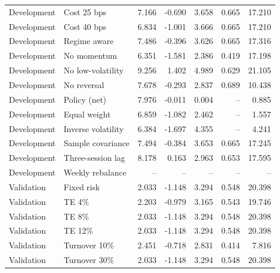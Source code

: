 \documentclass[11pt,a4paper]{article}
\begin{document}
\begin{center}
\begin{longtable}{@{}llrrrrr@{}}
Development & Cost 25 bps & 7.166 & -0.690 & 3.658 & 0.665 & 17.210\\

Development & Cost 40 bps & 6.834 & -1.001 & 3.666 & 0.665 & 17.210\\

Development & Regime aware & 7.486 & -0.396 & 3.626 & 0.665 & 17.316\\

Development & No momentum & 6.351 & -1.581 & 2.386 & 0.419 & 17.198\\

Development & No low-volatility & 9.256 & 1.402 & 4.989 & 0.629 & 21.105\\

Development & No reversal & 7.678 & -0.293 & 2.837 & 0.689 & 10.438\\

Development & Policy (net) & 7.976 & -0.011 & 0.004 & -- & 0.885\\

Development & Equal weight & 6.859 & -1.082 & 2.462 & -- & 1.557\\

Development & Inverse volatility & 6.384 & -1.697 & 4.355 & -- & 4.241\\

Development & Sample covariance & 7.494 & -0.384 & 3.653 & 0.665 & 17.245\\

Development & Three-session lag & 8.178 & 0.163 & 2.963 & 0.653 & 17.595\\

Development & Weekly rebalance & -- & -- & -- & -- & --\\

Validation & Fixed risk & 2.033 & -1.148 & 3.294 & 0.548 & 20.398\\

Validation & TE 4\% & 2.203 & -0.979 & 3.165 & 0.543 & 19.746\\

Validation & TE 8\% & 2.033 & -1.148 & 3.294 & 0.548 & 20.398\\

Validation & TE 12\% & 2.033 & -1.148 & 3.294 & 0.548 & 20.398\\

Validation & Turnover 10\% & 2.451 & -0.718 & 2.831 & 0.414 & 7.816\\

Validation & Turnover 30\% & 2.033 & -1.148 & 3.294 & 0.548 & 20.398\\


\end{longtable}
\end{center}
\end{document}
